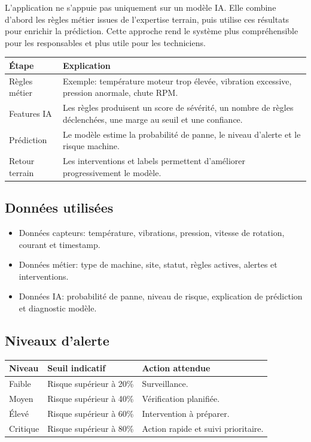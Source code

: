 \documentclass[10pt,a4paper]{article}
\begin{document}
L'application ne s'appuie pas uniquement sur un modèle IA.
Elle combine d'abord les règles métier issues de l'expertise terrain, puis utilise ces résultats pour enrichir la prédiction.
Cette approche rend le système plus compréhensible pour les responsables et plus utile pour les techniciens.

\begin{tabularx}{\textwidth}{p{3.4cm}Y}
\toprule
{}
\textbf{Étape} & \textbf{Explication} \\
\midrule
Règles métier & Exemple: température moteur trop élevée, vibration excessive, pression anormale, chute RPM. \\
Features IA & Les règles produisent un score de sévérité, un nombre de règles déclenchées, une marge au seuil et une confiance. \\
Prédiction & Le modèle estime la probabilité de panne, le niveau d'alerte et le risque machine. \\
Retour terrain & Les interventions et labels permettent d'améliorer progressivement le modèle. \\
\bottomrule
\end{tabularx}

\subsection{Données utilisées}

\begin{itemize}
  \item Données capteurs: température, vibrations, pression, vitesse de rotation, courant et timestamp.
  \item Données métier: type de machine, site, statut, règles actives, alertes et interventions.
  \item Données IA: probabilité de panne, niveau de risque, explication de prédiction et diagnostic modèle.
\end{itemize}

\subsection{Niveaux d'alerte}

\begin{tabularx}{\textwidth}{p{3cm}p{4cm}Y}
\toprule
{}
\textbf{Niveau} & \textbf{Seuil indicatif} & \textbf{Action attendue} \\
\midrule
Faible & Risque supérieur à 20\% & Surveillance. \\
Moyen & Risque supérieur à 40\% & Vérification planifiée. \\
Élevé & Risque supérieur à 60\% & Intervention à préparer. \\
Critique & Risque supérieur à 80\% & Action rapide et suivi prioritaire. \\
\bottomrule
\end{tabularx}
\end{document}
